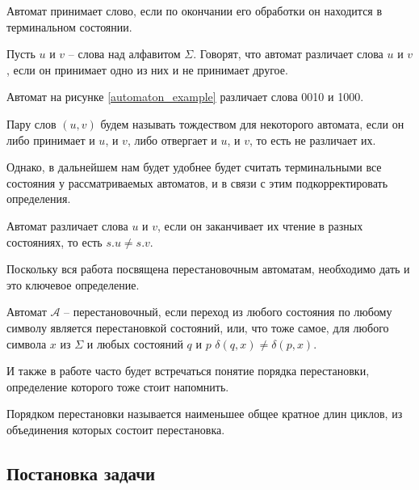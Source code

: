 \begin{definition}
	Автомат принимает слово, если по окончании его обработки он находится в терминальном состоянии.
\end{definition}
\begin{definition}
	Пусть $u$ и $v$ – слова над алфавитом $\Sigma$. Говорят, что автомат различает слова $u$ и $v$, если он принимает одно из них и не принимает другое. 
\end{definition}

\begin{example}
	Автомат на рисунке \ref{automaton_example} различает слова 0010 и 1000.
\end{example}

\label{automaton_example}

\begin{definition}
	Пару слов $(u, v)$ будем называть тождеством для некоторого автомата, если он либо принимает и $u$, и $v$, либо отвергает и $u$, и $v$, то есть не различает их.
\end{definition}

Однако, в дальнейшем нам будет удобнее будет считать терминальными все состояния у рассматриваемых автоматов, и в связи с этим подкорректировать определения.

\begin{definition}
	Автомат различает слова $u$ и $v$, если он заканчивает их чтение в разных состояниях, то есть $s.u \ne s.v$. 
\end{definition}

Поскольку вся работа посвящена перестановочным автоматам, необходимо дать и это ключевое определение.
\begin{definition} 
	Автомат $\mathscr{A}$ – перестановочный, если переход из любого состояния по любому символу является перестановкой состояний, или, что тоже самое, для любого символа $x$ из $\Sigma$ и любых состояний $q$ и $p$ $\delta(q, x) \ne \delta(p, x)$.
\end{definition}

И также в работе часто будет встречаться понятие порядка перестановки, определение которого тоже стоит напомнить.
\begin{definition}
	Порядком перестановки называется наименьшее общее кратное длин циклов, из объединения которых состоит перестановка.
\end{definition}

\subsection{Постановка задачи}
 
